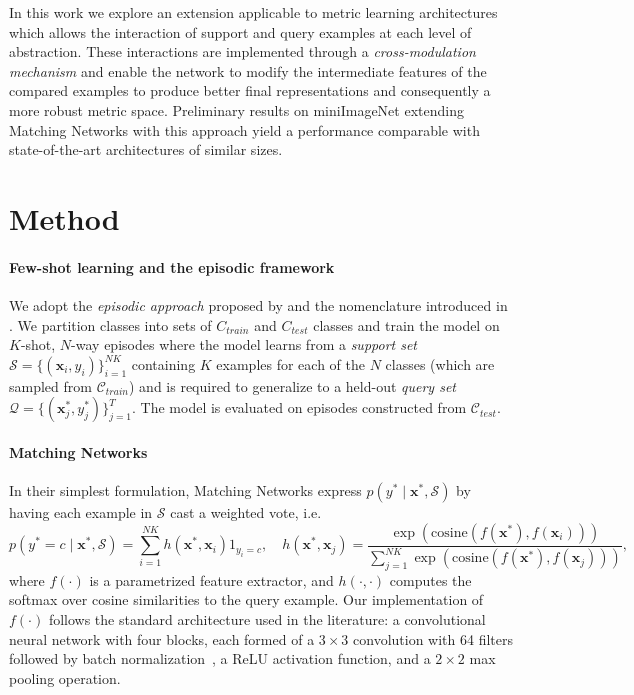 \documentclass{article}
\begin{document}
In this work we explore an extension applicable to metric learning
architectures which allows the interaction of support and query
examples at each level of abstraction. These interactions are
implemented through a \emph{cross-modulation mechanism} and enable the
network to modify the intermediate features of the compared examples
to produce better final representations and consequently a more robust
metric space. Preliminary results on miniImageNet extending Matching
Networks with this approach yield a performance comparable with
state-of-the-art architectures of similar sizes.

\section{Method}
\label{sec:method}

\paragraph{Few-shot learning and the episodic framework} We adopt the
{\em episodic approach} proposed by \cite{vinyals2016matching} and
the nomenclature introduced in \cite{ren2018meta}. We partition classes
into sets of $C_{train}$ and $C_{test}$ classes and train the model on
$K$-shot, $N$-way episodes where the model learns from a {\em support set}
$\mathcal{S} = \{(\mathbf{x}_i, y_i)\}_{i=1}^{NK}$ containing $K$ examples
for each of the $N$ classes  (which are sampled from $\mathcal{C}_{train}$)
and is required to generalize to a held-out {\em query set}
$\mathcal{Q} = \{(\mathbf{x}_j^*, y_j^*)\}_{j=1}^{T}$. The model is evaluated on
episodes constructed from $\mathcal{C}_{test}$.


\paragraph{Matching Networks}

In their simplest formulation, Matching Networks express
$p(y^* \mid \mathbf{x}^*, \mathcal{S})$ by having each example
in $\mathcal{S}$ cast a weighted vote, i.e.
\begin{equation}
  \label{eq:softmax}
  p(y^*=c \mid \mathbf{x}^*, \mathcal{S}) =
      \sum_{i=1}^{NK} h(\mathbf{x}^*, \mathbf{x}_i) 1_{y_i = c}, \quad
  h(\mathbf{x}^*, \mathbf{x}_j) =
      \frac{\exp(\mathrm{cosine}(f(\mathbf{x}^*), f(\mathbf{x}_i)))}
           {\sum_{j = 1}^{NK} \exp(\mathrm{cosine}(f(\mathbf{x}^*), f(\mathbf{x}_j)))},
\end{equation}
where $f(\cdot)$ is a parametrized feature extractor, and $h(\cdot, \cdot)$
computes the softmax over cosine similarities to the query example. Our
implementation of $f(\cdot)$ follows the standard architecture used in
the literature: a convolutional neural network with four blocks, each formed
of a $3 \times 3$ convolution with 64 filters followed by batch
normalization~\cite{ioffe15batchnorm}, a ReLU activation function, and
a $2 \times 2$ max pooling operation.
\end{document}
